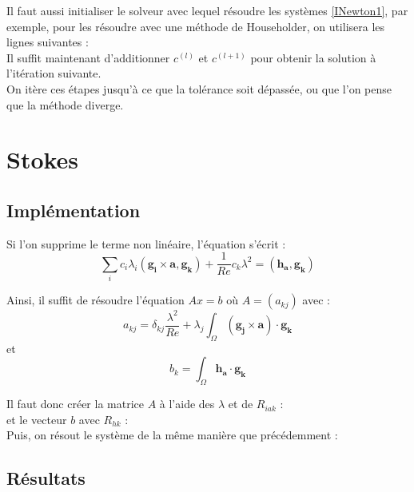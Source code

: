 Il faut aussi initialiser le solveur avec lequel résoudre les systèmes \ref{INewton1}, par exemple, pour les résoudre avec une méthode de Householder, on utilisera les lignes suivantes :\\


Il suffit maintenant d'additionner $c^{(l)}$ et $c^{(l+1)}$ pour obtenir la solution à l'itération suivante.\\


On itère ces étapes jusqu'à ce que la tolérance soit dépassée, ou que l'on pense que la méthode diverge.

\section{Stokes}
\subsection{Implémentation}

Si l'on supprime le terme non linéaire, l'équation s'écrit :
\[ \sum_i c_i\lambda_i(\bm{g_i}\times\bm{a},\bm{g_k}) +\frac{1}{Re}c_k\lambda^2 = (\bm{h_a},\bm{g_k}) \]

Ainsi, il suffit de résoudre l'équation $Ax=b$ où $A=(a_{kj})$ avec :
\[ a_{kj} = \delta_{kj}\frac{\lambda^2}{Re} + \lambda_j\int_\Omega (\bm{g_j}\times\bm{a})\cdot\bm{g_k} \]
et
\[ b_k = \int_\Omega \bm{h_a}\cdot\bm{g_k} \]

Il faut donc créer la matrice $A$ à l'aide des $\lambda$ et de $R_{iak}$ :\\

et le vecteur $b$ avec $R_{hk}$ :\\


Puis, on résout le système de la même manière que précédemment :\\


\subsection{Résultats}



